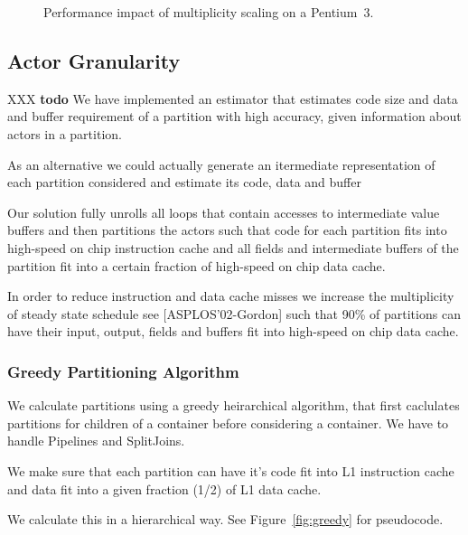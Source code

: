 \begin{figure*}
  \caption{Performance impact of multiplicity scaling on a Pentium~3.}
  \label{fig:90-10}
\end{figure*}

\subsection{Actor Granularity}

XXX {\bf todo}
We have implemented an estimator that estimates code size and
data and buffer requirement of a partition with high accuracy, 
given information about actors in a partition.

As an alternative we could actually generate an itermediate 
representation of each partition considered and estimate its
code, data and buffer 

Our solution fully unrolls all loops that contain accesses to
intermediate value buffers and then partitions the actors such 
that code for each partition fits into high-speed on chip 
instruction cache and all fields and intermediate 
buffers of the partition fit into a certain fraction 
of high-speed on chip data cache.

In order to reduce instruction and data cache misses we increase
the multiplicity of steady state schedule see [ASPLOS'02-Gordon] such 
that 90\% of partitions can have their input, output, fields
and buffers fit into high-speed on chip data cache.

\subsubsection{Greedy Partitioning Algorithm}

We calculate partitions using a greedy heirarchical 
algorithm, that first caclulates partitions for children
of a container before considering a container.
We have to handle Pipelines and SplitJoins.

We make sure that each partition can have it's code fit into
L1 instruction cache and data fit into a given fraction (1/2)
of L1 data cache.

We calculate this in a hierarchical way. See Figure~\ref{fig:greedy}
for pseudocode.

